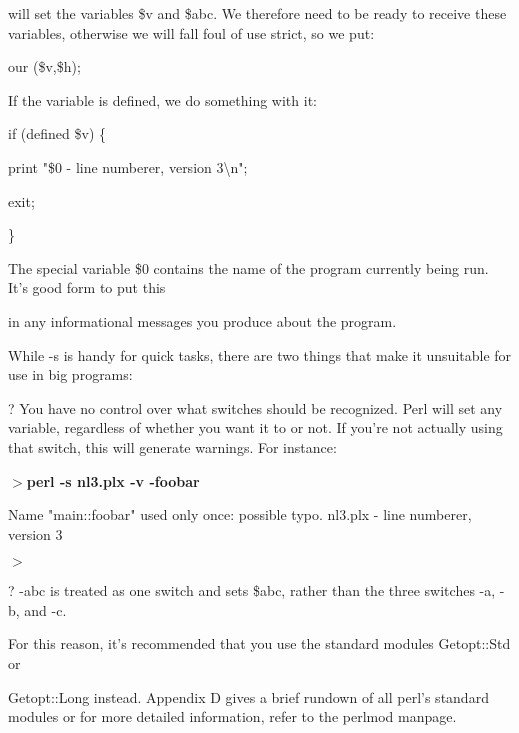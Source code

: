 \documentclass[a4paper,11pt]{book}
\begin{document}
\noindent will set the variables \$v and \$abc. We therefore need to be ready to receive these variables, otherwise we will fall foul of use strict, so we put:

\noindent 

\noindent our (\$v,\$h);

\noindent 

\noindent If the variable is defined, we do something with it:

\noindent 

\noindent if (defined \$v) \{

\noindent print "\$0 - line numberer, version 3\textbackslash n";

\noindent exit;

\noindent \}

\noindent 

\noindent The special variable \$0 contains the name of the program currently being run. It's good form to put this

\noindent in any informational messages you produce about the program.

\noindent 

\noindent While -s is handy for quick tasks, there are two things that make it unsuitable for use in big programs:

\noindent 

\noindent ? You have no control over what switches should be recognized. Perl will set any variable, regardless of whether you want it to or not. If you're not actually using that switch, this will generate warnings. For instance:

\noindent 

\noindent $>$\textbf{perl -s nl3.plx -v -foobar}

\noindent Name "main::foobar" used only once: possible typo. nl3.plx - line numberer, version 3

\noindent $>$

\noindent 

\noindent ? -abc is treated as one switch and sets \$abc, rather than the three switches -a, -b, and -c.

\noindent 

\noindent 

\noindent For this reason, it's recommended that you use the standard modules Getopt::Std or

\noindent Getopt::Long instead. Appendix D gives a brief rundown of all perl's standard modules or for more detailed information, refer to the perlmod manpage.
\end{document}
